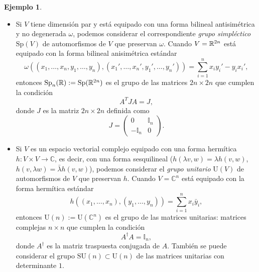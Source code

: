 \documentclass[11pt,a4paper]{amsbook}
\theoremstyle{remark} \newtheorem{rmk}[subsection]{Observación}
\theoremstyle{definition} \newtheorem{defn}[subsection]{Definición}
\theoremstyle{definition} \newtheorem{ex}[subsection]{Ejemplo}
\theoremstyle{definition} \newtheorem{ej}[subsection]{Ejercicio}
\begin{document}
\begin{ex}
\begin{itemize}
  \item Si $V$ tiene dimensión par y está equipado con una forma bilineal antisimétrica y no degenerada $\omega$, podemos considerar el correspondiente \emph{grupo simpléctico} $\mathrm{Sp}(V)$ de automorfismos de $V$ que preservan $\omega$. Cuando $V=\mathbb R^{2n}$ está equipado con la forma bilineal anisimétrica estándar
        \begin{equation*}
\omega((x_1,\dots,x_n,y_1,\dots,y_n),(x_1',\dots,x_n',y_1',\dots,y_n')) = \sum_{i=1}^n x_iy_i' - y_i x_i',
        \end{equation*}
        entonces $\mathrm{Sp}_n(\mathbb R):=\mathrm{Sp}(\mathbb R^{2n})$ es el grupo de las matrices $2n \times 2n$ que cumplen la condición
        \begin{equation*}
A^T J A = J,
        \end{equation*}
        donde $J$ es la matriz $2n \times 2n$ definida como
        \begin{equation*}
          J=
          \begin{pmatrix}
            0 & \mathbb{I}_n \\
            -\mathbb{I}_n & 0
          \end{pmatrix}.
        \end{equation*}

  \item Si $V$ es un espacio vectorial complejo equipado con una forma hermítica $h:V\times V\rightarrow \mathbb{C}$, es decir, con una forma sesquilineal ($h(\lambda v,w)=\lambda h(v,w)$, $h(v,\lambda w)=\bar{\lambda} h(v,w)$), podemos considerar el \emph{grupo unitario} $\mathrm{U}(V)$ de automorfismos de $V$ que preservan $h$. Cuando $V=\mathbb{C}^n$ está equipado con la forma hermítica estándar
        \begin{equation*}
h((x_1,\dots,x_n),(y_1,\dots,y_n)) = \sum_{i=1}^n x_i \bar{y}_i,
        \end{equation*}
        entonces $\mathrm{U}(n):= \mathrm{U}(\mathbb{C}^n)$ es el grupo de las matrices unitarias: matrices complejas $n\times n$ que cumplen la condición
        \begin{equation*}
A^\dagger A = \mathbb{I}_n,
        \end{equation*}
donde $A^\dagger$ es la matriz traspuesta conjugada de $A$. También se puede considerar el grupo $\mathrm{SU}(n)\subset \mathrm{U}(n)$ de las matrices unitarias con determinante $1$.
\end{itemize}
\end{ex}
\end{document}
